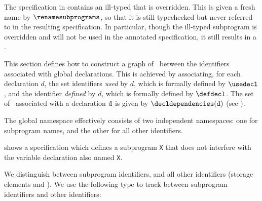 

The specification in  contains an ill-typed \Proseimpdefsubprogram{} that is overridden.
This is given a fresh name by $\renamesubprograms$, so that it is still typechecked but never referred to in the resulting specification.
In particular, though the ill-typed subprogram is overridden and will not be used in the annotated specification, it still results in a
\typingerrorterm.


This section defines how to construct a graph of \ between the identifiers associated
with global declarations.
This is achieved by associating, for each declaration $d$, the set identifiers \emph{used} by $d$,
which is formally defined by $\usedecl$, and the identifier \emph{defined} by $d$,
which is formally defined by $\defdecl$.
%
The set of \ associated with a declaration $\texttt{d}$ is given by
$\decldependencies(\vd)$ (see ).

The global namespace effectively consists of two independent namespaces: one for subprogram names, and the other for all other identifiers.

 shows a specification which defines a subprogram \verb|X|
that does not interfere with the variable declaration also named \verb|X|.

We distinguish between subprogram identifiers, and all other identifiers (storage elements and \namedtypes{}).
We use the following type to track  between subprogram identifiers and other identifiers:



